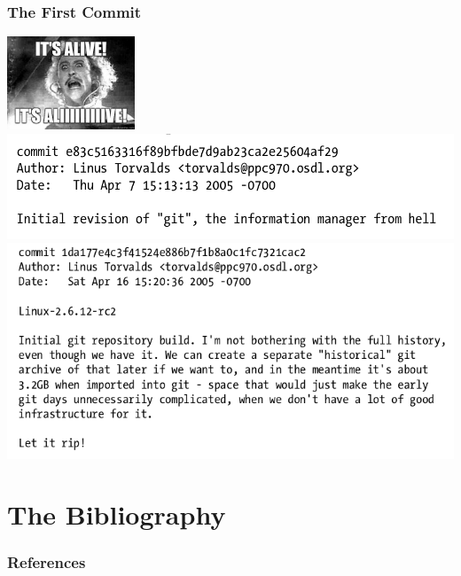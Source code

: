 \documentclass[22pt]{beamer}
\begin{document}
\begin{frame}[allowframebreaks]
    \frametitle{The First Commit}
\includegraphics[width=1.5in]{images/f9be73d4751820774892a1db5810d315.jpg}
    \includegraphics[width=\linewidth]{images/Screenshot from 2020-12-10 13-43-08.png}
    \includegraphics[width=\linewidth]{images/Screenshot from 2020-12-10 13-35-57.png}


\end{frame}

\section{The Bibliography}
\begin{frame}[allowframebreaks]
    \frametitle{References}
    
    
\end{frame}
\end{document}
